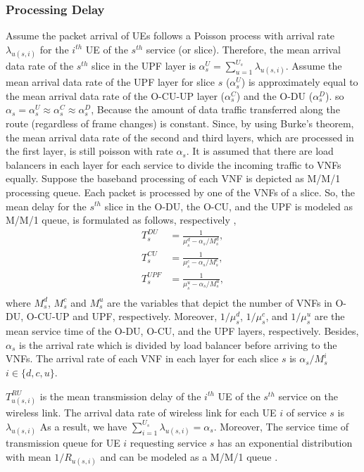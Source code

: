 \documentclass[conference]{IEEEtran}
\begin{document}
\subsubsection{Processing Delay}
Assume the packet arrival of UEs follows a Poisson process with arrival rate $\lambda_{u(s,i)}$ for the $i^{th}$ UE of the $s^{th}$ service (or slice).
Therefore, the mean arrival data rate of the $s^{th}$ slice in the UPF layer is $\alpha_{s}^U = \sum_{u=1}^{U_s}\lambda_{u(s,i)}$.
Assume the mean arrival data rate of the UPF layer for slice $s$ ($\alpha_{s}^U$) is approximately equal to the mean arrival data rate of the O-CU-UP layer ($\alpha_{s}^C$) and the O-DU ($\alpha_{s}^D$). so $\alpha_{s} =\alpha_{s}^U \approx \alpha_{s}^C \approx \alpha_{s}^D$,
Because the amount of data traffic transferred along the route (regardless of frame changes) is constant.
Since, by using Burke’s theorem, the mean arrival data rate of the second and third layers, which are processed in the first layer, is still poisson with rate $\alpha_{s}$.
It is assumed that there are load balancers in each layer for each service to divide the incoming traffic to VNFs equally. %
Suppose the baseband processing of each VNF is depicted as M/M/1 processing queue.
Each packet is processed by one of the VNFs of a slice. So, the mean delay for the $s^{th}$ slice in the O-DU, the O-CU, and the UPF is modeled as M/M/1 queue, is formulated as follows, respectively \cite{SystemCostMinimization,luong2018joint,luong2018novel},
\begin{equation}
\begin{split}
T_{s}^{DU} &= \frac{1}{\mu_s^d - \alpha_{s}/{M_s^{d}}},\\
T_{s}^{CU} &= \frac{1}{\mu_s^c - \alpha_{s}/{M_s^{c}}},\\
T_{s}^{UPF} &= \frac{1}{\mu_s^u - \alpha_{s}/{M_s^{u}}},\\
\end{split}
\end{equation}
where $M_s^{d}$, $M_s^{c}$ and 
$M_s^{u}$ are the variables that depict the number of VNFs in O-DU, O-CU-UP and UPF, respectively. 
Moreover, $1/\mu_s^d$, $1/\mu_s^c$, and $1/\mu_s^u$ are the mean service time of the O-DU, O-CU, and the UPF layers, respectively.
Besides, $\alpha_{s}$ is the  arrival rate which is divided
by load balancer before arriving to the VNFs. The arrival rate of each VNF in each layer for each slice 
$s$ is $\alpha_{s}/{M_s^{i}}$ $ i \in \{d,c, u\}$.

$T_{u(s,i)}^{RU}$ is the mean transmission delay of the $i^{th}$ UE of the $s^{th}$ service on the wireless link.
 The arrival data rate of wireless link for each UE $i$ of service $s$ is $\lambda_{u(s,i)}$
As a result, we have $\sum_{i = 1}^{U_s} \lambda_{u(s,i)} = \alpha_s$.
Moreover, The service time of transmission queue for UE $i$ requesting service $s$ has
an exponential distribution with mean $1/R_{u(s,i)}$ and can be modeled as a M/M/1 queue \cite{SystemCostMinimization,luong2018joint,luong2018novel}.
 
\end{document}
